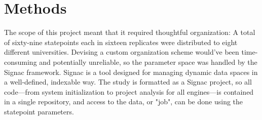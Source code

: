 \section{Methods}

The scope of this project meant that it required thoughtful organization: A total of sixty-nine statepoints each in sixteen replicates were distributed to eight different universities.
Devising a custom organization scheme would've been time-consuming and potentially unreliable, so the parameter space was handled by the Signac framework\cite{Adorf2018, signac_zenodo, signac_scipy_2018, signac_scipy_2021}.
Signac is a tool designed for managing dynamic data spaces in a well-defined, indexable way.
The study is formatted as a Signac project, so all code---from system initialization to project analysis for all engines---is contained in a single repository, and access to the data, or "job", can be done using the statepoint parameters.

